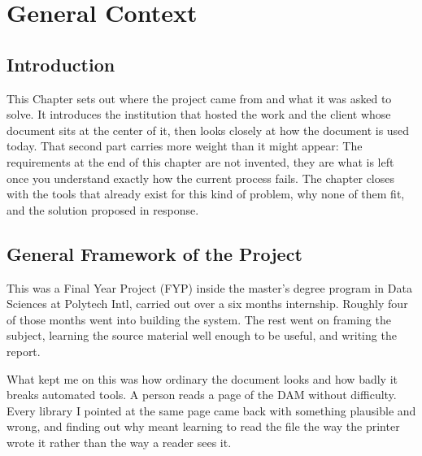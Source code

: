 \chapter{General Context}
\label{ch:context}
\minitoc

\section*{Introduction}
This Chapter sets out where the project came from and what it was asked to solve. It introduces the institution that hosted the work and the client whose document sits at the center of it, then looks closely at how the document is used today. That second part carries more weight than it might appear: The requirements at the end of this chapter are not invented, they are what is left once you understand exactly how the current process fails. The chapter closes with the tools that already exist for this kind of problem, why none of them fit, and the solution proposed in response.

\section{General Framework of the Project}
This was a Final Year Project (FYP) inside the master's degree program in Data Sciences at Polytech Intl, carried out over a six months internship. Roughly four of those months went into building the system. The rest went on framing the subject, learning the source material well enough to be useful, and writing the report.



 What kept me on this was how ordinary the document looks and how badly it breaks automated tools. A person reads a page of the DAM without difficulty. Every library I pointed at the same page came back with something plausible and wrong, and finding out why meant learning to read the file the way the printer wrote it rather than the way a reader sees it. 
 
